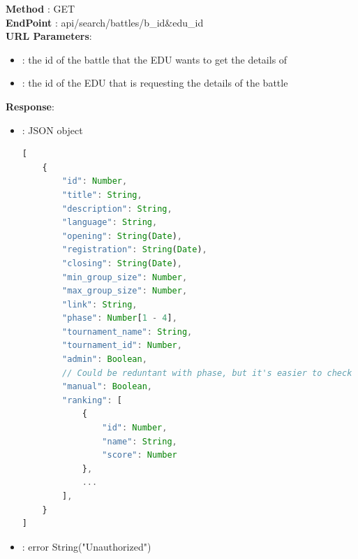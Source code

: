 \textbf{Method} : GET \\
\textbf{EndPoint} : api/search/battles/{b\_id}\&{edu\_id}\\
\textbf{URL Parameters}:
\begin{itemize}
    \item {}: the id of the battle that the EDU wants to get the details of
    \item {}: the id of the EDU that is requesting the details of the battle
\end{itemize}
\textbf{Response}:
\begin{itemize}
    \item {} : JSON object
          \begin{lstlisting}[language=JavaScript, label={lst:jscode}, basicstyle=\ttfamily]
[
    {
        "id": Number,
        "title": String,
        "description": String,
        "language": String,
        "opening": String(Date),
        "registration": String(Date),
        "closing": String(Date),
        "min_group_size": Number,
        "max_group_size": Number,
        "link": String,
        "phase": Number[1 - 4],
        "tournament_name": String,
        "tournament_id": Number,
        "admin": Boolean,
        // Could be reduntant with phase, but it's easier to check
        "manual": Boolean,
        "ranking": [
            {
                "id": Number,
                "name": String,
                "score": Number
            },
            ...
        ],
    }
]
            \end{lstlisting}
    \item {} : error String("Unauthorized")
\end{itemize}

